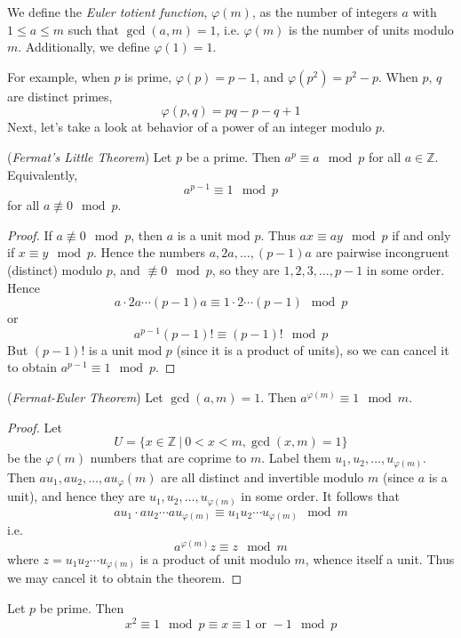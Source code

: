 \documentclass[10pt, a4paper, twoside]{report}
\begin{document}
\begin{definition}
    We define the \emph{Euler totient function}, \(\varphi(m)\), as the number of integers \(a\) with \(1\leq a\leq m\) such that \(\gcd(a,m)=1\), i.e. \(\varphi(m)\) is the number of units modulo \(m\). Additionally, we define \(\varphi(1)=1\).
\end{definition}
For example, when \(p\) is prime, \(\varphi(p)=p-1\), and \(\varphi(p^2)=p^2-p\). When \(p\), \(q\) are distinct primes,
\[\varphi(p,q)=pq-p-q+1\]
Next, let's take a look at behavior of a power of an integer modulo \(p\).
\begin{theorem}
    (\emph{Fermat's Little Theorem})
    Let \(p\) be a prime. Then \(a^p\equiv a\mod p\) for all \(a\in\mathbb{Z}\). Equivalently, 
    \[a^{p-1}\equiv 1\mod p\]
    for all \(a\nequiv 0\mod p\).
    \label{thm:flt}
\end{theorem}
\begin{proof}
    If \(a\nequiv 0\mod p\), then \(a\) is a unit mod \(p\). Thus \(ax\equiv ay\mod p\) if and only if \(x\equiv y\mod p\). Hence the numbers \(a,2a,\ldots,(p-1)a\) are pairwise incongruent (distinct) modulo \(p\), and \(\nequiv 0\mod p\), so they are \(1,2,3,\ldots,p-1\) in some order. Hence 
    \[a\cdot 2a\cdots(p-1)a\equiv 1\cdot2\cdots(p-1)\mod p\]
    or 
    \[a^{p-1}(p-1)!\equiv(p-1)!\mod p\]
    But \((p-1)!\) is a unit mod \(p\) (since it is a product of units), so we can cancel it to obtain \(a^{p-1}\equiv 1\mod p\).
\end{proof}
\begin{theorem}
    (\emph{Fermat-Euler Theorem}) Let \(\gcd(a,m)=1\). Then \(a^{\varphi(m)}\equiv 1\mod m\).
    \label{thm:euler}
\end{theorem}
\begin{proof}
    Let 
    \[U=\{x\in\mathbb{Z}\:|\:0<x<m,\gcd(x,m)=1\}\]
    be the \(\varphi(m)\) numbers that are coprime to \(m\). Label them \(u_1,u_2,\ldots,u_{\varphi(m)}\). Then \(au_1,au_2,\ldots,au_\varphi(m)\) are all distinct and invertible modulo \(m\) (since \(a\) is a unit), and hence they are \(u_1,u_2,\ldots,u_{\varphi(m)}\) in some order. It follows that 
    \[au_1\cdot au_2\cdots au_{\varphi(m)}\equiv u_1u_2\cdots u_{\varphi(m)}\mod m\]
    i.e. 
    \[a^{\varphi(m)}z\equiv z\mod m\]
    where \(z=u_1u_2\cdots u_{\varphi(m)}\) is a product of unit modulo \(m\), whence itself a unit. Thus we may cancel it to obtain the theorem.
\end{proof}
\begin{lemma}
    Let \(p\) be prime. Then
    \[x^2\equiv 1\mod p\equiv x\equiv 1\text{  or  } -1\mod p\]
    \label{lemma:square_modp}
\end{lemma}
\end{document}
